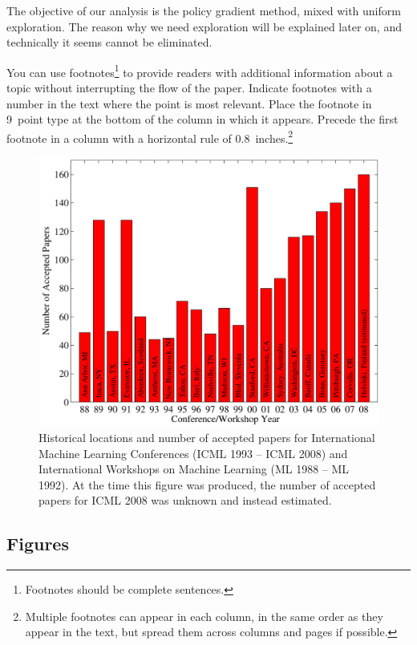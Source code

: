 \documentclass{article}
\begin{document}
The objective of our analysis is the policy gradient method, mixed with uniform exploration. The reason why we need exploration will be explained later on, and technically it seems cannot be eliminated.

You can use footnotes\footnote{Footnotes
should be complete sentences.} to provide readers with additional
information about a topic without interrupting the flow of the paper.
Indicate footnotes with a number in the text where the point is most
relevant. Place the footnote in 9~point type at the bottom of the
column in which it appears. Precede the first footnote in a column
with a horizontal rule of 0.8~inches.\footnote{Multiple footnotes can
appear in each column, in the same order as they appear in the text,
but spread them across columns and pages if possible.}

\begin{figure}[ht]
\vskip 0.2in
\begin{center}
\centerline{\includegraphics[width=\columnwidth]{icml_numpapers}}
\caption{Historical locations and number of accepted papers for International
Machine Learning Conferences (ICML 1993 -- ICML 2008) and International
Workshops on Machine Learning (ML 1988 -- ML 1992). At the time this figure was
produced, the number of accepted papers for ICML 2008 was unknown and instead
estimated.}
\label{icml-historical}
\end{center}
\vskip -0.2in
\end{figure}

\subsection{Figures}
\end{document}
